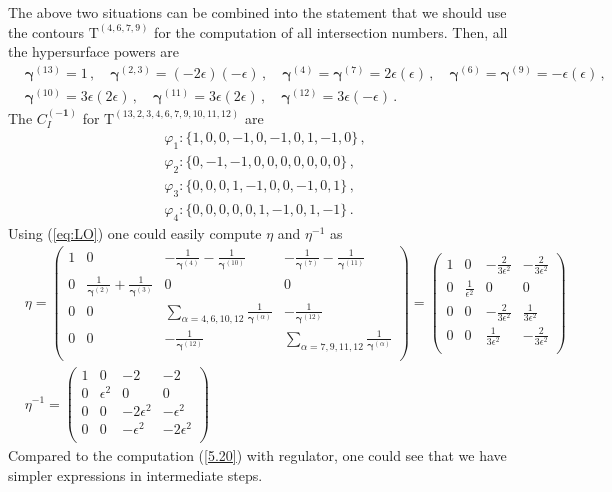 \documentclass[a4paper,11pt]{article}
\newcommand{\nn}{\nonumber}
\newcommand{\nT}{\mathrm{T}}
\newcommand{\ep}{\epsilon}
\def\eref#1{(\ref{#1})}
\begin{document}
The above two situations can be combined into the statement that we should use the contours $\nT^{(4,6,7,9)}$ for the 
computation of all intersection numbers. 
Then, all the hypersurface powers are
\begin{align}
&\bm{\gamma}^{(13)}=1 \,, \quad \bm{\gamma}^{(2,3)}=(-2\ep)(-\ep) \,, \quad \bm{\gamma}^{(4)}= \bm{\gamma}^{(7)}= 2\ep(\ep) \,,\quad \bm{\gamma}^{(6)}= \bm{\gamma}^{(9)}= -\ep(\ep) \,,\nn\\
&\bm{\gamma}^{(10)}=3\ep \left(2 \ep\right) \, , \quad \bm{\gamma}^{(11)}=3\ep \left(2 \ep\right) \, ,
\quad \bm{\gamma}^{(12)}=3\ep(-\ep) \,.
\end{align}
The $C^{(\bm{-1})}_I$ for $\nT^{(13,2,3,4,6,7,9,10,11,12)}$ are
\begin{align}
&\varphi_{1}:\{1,0,0,-1,0,-1,0,1,-1,0\}\,,\nn\\
&\varphi_{2}:\{0,-1,-1,0,0,0,0,0,0,0\}\,,\nn\\
&\varphi_{3}:\{0,0,0,1,-1,0,0,-1,0,1\}\,,\nn\\
&\varphi_{4}:\{0,0,0,0,0,1,-1,0,1,-1\}\,.  \label{eq:commonpoleRC}
\end{align}
Using \eref{eq:LO} one could easily compute $\eta$ and $\eta^{-1}$ as
\begin{align} 
&\eta=\left(
\begin{array}{cccc}
 1 & 0 & -\frac{1}{\bm{\gamma}^{(4)}}-\frac{1}{\bm{\gamma}^{(10)}} & -\frac{1}{\bm{\gamma}^{(7)}}-\frac{1}{\bm{\gamma}^{(11)}} \\
 0 & \frac{1}{\bm{\gamma}^{(2)}}+\frac{1}{\bm{\gamma}^{(3)}} & 0 & 0 \\
0 & 0 &  \sum_{\alpha=4,6,10,12}\frac{1}{\bm{\gamma}^{(\alpha)}} & -\frac{1}{\bm{\gamma}^{(12)}} \\
0 & 0 & -\frac{1}{\bm{\gamma}^{(12)}}  &  \sum_{\alpha=7,9,11,12}\frac{1}{\bm{\gamma}^{(\alpha)}} \\
\end{array}
\right)=\left(
\begin{array}{cccc}
 1 & 0 & -\frac{2}{3 \ep^2} & -\frac{2}{3 \ep^2} \\
 0 & \frac{1}{\epsilon ^2} & 0 & 0 \\
 0 & 0 & -\frac{2}{3 \ep^2} & \frac{1}{3 \ep^2} \\
0 & 0 & \frac{1}{3 \ep^2} & -\frac{2}{3 \ep^2} \\
\end{array}
\right)  \nn\\
&\eta^{-1}= \left(
\begin{array}{cccc}
 1 & 0 & -2 & -2 \\
 0 & \epsilon ^2 & 0 & 0 \\
 0 & 0 & -2 \epsilon ^2 & -\epsilon ^2 \\
 0 & 0 & -\epsilon ^2 & -2 \epsilon ^2 \\
\end{array}
\right)~~~~\label{5.28}
\end{align}
Compared to the  computation \eref{5.20} with regulator, one could see that we  have simpler expressions in intermediate steps.
\end{document}

